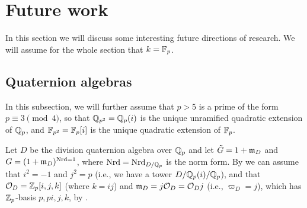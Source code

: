 \section{Future work}%
\label{sec:future}

In this section we will discuss some interesting future directions of research. We will assume for the whole section that $k = \mathbb{F}_{p}$.

\subsection{Quaternion algebras}%
\label{subsec:quat-algs}

In this subsection, we will further assume that $p>5$ is a prime of the form $p \equiv 3 \pmod{4}$, so that $\mathbb{Q}_{p^{2}} = \mathbb{Q}_{p}(i)$ is the unique unramified quadratic extension of $\mathbb{Q}_{p}$, and $\mathbb{F}_{p^{2}} = \mathbb{F}_{p}[i]$ is the unique quadratic extension of $\mathbb{F}_{p}$.

Let $D$ be the division quaternion algebra over $\mathbb{Q}_{p}$ and let $\tilde{G} = 1+\mathfrak{m}_{D}$ and $G = (1+\mathfrak{m}_{D})^{\operatorname{Nrd} = 1}$, where $\operatorname{Nrd} = \operatorname{Nrd}_{D/\mathbb{Q}_{p}}$ is the norm form. By \cite[Thm.~12.1.5]{Voight} we can assume that $i^{2} = -1$ and $j^{2} = p$ (i.e., we have a tower $D / \mathbb{Q}_{p}(i) / \mathbb{Q}_{p}$), and that $\mathcal{O}_{D}=\mathbb{Z}_{p}[i,j,k]$ (where $k=ij$) and $\mathfrak{m}_{D} = j\mathcal{O}_{D} = \mathcal{O}_{D}j$ (i.e., $\varpi_{D} = j$), which has $\mathbb{Z}_{p}$-basis $p,pi,j,k$, by \cite[Thm.13.1.6]{Voight}.

